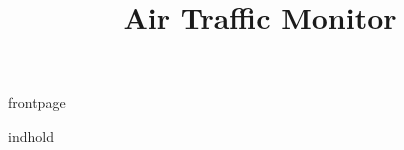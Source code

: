 \documentclass[a4paper]{article}								%
\title{Air Traffic Monitor}
\begin{document}

	{frontpage}

	\tableofcontents\thispagestyle{fancy} \newpage
	
	{indhold}


\end{document}
